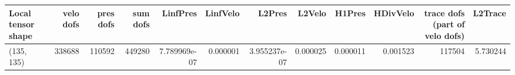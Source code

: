 \begin{tabular}{lrrrrrrrrrrr}
\toprule
Local tensor shape &  velo dofs &  pres dofs &  sum dofs &     LinfPres &  LinfVelo &       L2Pres &   L2Velo &   H1Pres &  HDivVelo &  trace dofs (part of velo dofs) &  L2Trace \\
\midrule
        (135, 135) &     338688 &     110592 &    449280 & 7.789969e-07 &  0.000001 & 3.955237e-07 & 0.000025 & 0.000011 &  0.001523 &                          117504 & 5.730244 \\
\bottomrule
\end{tabular}
